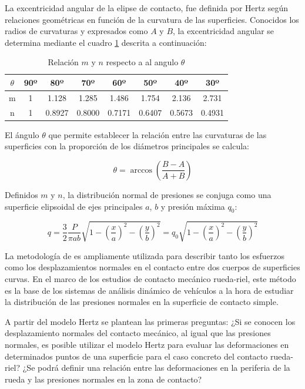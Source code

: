 \documentclass[main]{subfiles}
\begin{document}
La excentricidad angular de la elipse de contacto, fue definida por Hertz según relaciones geométricas en función de la curvatura de las superficies. Conocidos los radios de curvaturas y expresados como $A$ y $B$, la excentricidad angular se determina mediante el cuadro \ref{tab:Hertzmn} descrita a continuación:

\begin{table}[!htbp]
\centering
\caption{Relación $m$ y $n$ respecto a al angulo $\theta$}

\begin{tabular}{ c | c c c c c c c  }

\label{tab:Hertzmn}

 $\theta$ & 90º & 80º & 70º & 60º & 50º & 40º & 30º \\ 
 \hline
 m & 1 & 1.128 & 1.285 & 1.486 & 1.754 & 2.136 & 2.731 \\ 
 n & 1 & 0.8927 & 0.8000 & 0.7171 & 0.6407 & 0.5673 & 0.4931 \\ 
\end{tabular} 

\end{table}


El ángulo $\theta$ que permite establecer la relación entre las curvaturas de las superficies con la proporción de los diámetros principales se calcula:

\begin{equation}
\theta=\arccos\left(\frac{B-A}{A+B}\right)
\end{equation}

Definidos $m$ y $n$, la distribución normal de presiones se conjuga como una superficie elipsoidal de ejes principales $a$, $b$ y  presión máxima  $q_0$:

\begin{equation}
\label{eq:NormHerz}
q=\frac{3}{2}\frac{P}{\pi a b}
\sqrt{1-\left(\frac{x}{a}\right)^2-
\left(\frac{y}{b}\right)^2}=q_0
\sqrt{1-\left(\frac{x}{a}\right)^2-
\left(\frac{y}{b}\right)^2}
\end{equation}

La metodología de \citet{Herz1881} es ampliamente utilizada para describir tanto los esfuerzos como los desplazamientos normales en el contacto entre dos cuerpos de superficies curvas. En el marco de los estudios de contacto mecánico rueda-riel, este método es la base de los sistemas de análisis dinámico de vehículos a la hora de estudiar la distribución de las presiones normales en la superficie de contacto simple.
 
A partir del modelo Hertz se plantean las primeras preguntas: ¿Si se conocen los desplazamiento normales del contacto mecánico, al igual que las presiones normales, es posible utilizar el modelo Hertz para evaluar las deformaciones en determinados puntos de una superficie para el caso concreto del contacto rueda-riel? ¿Se podrá definir una relación entre las deformaciones en la periferia de la rueda y las presiones normales en la zona de contacto?
\end{document}
